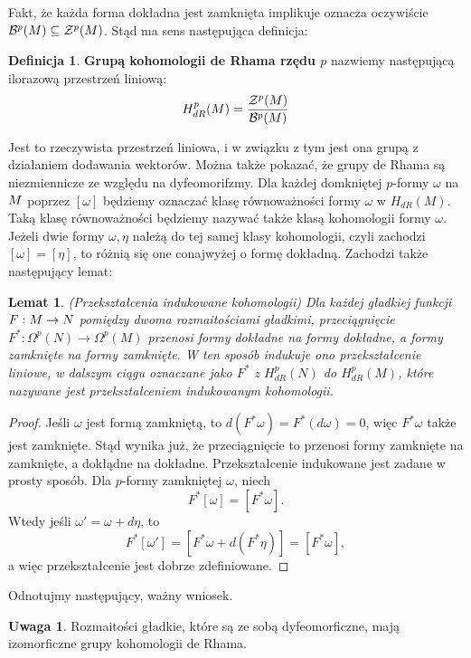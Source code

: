 \documentclass[licencjacka]{pracamgr}
\theoremstyle{definition}
\newtheorem{definition}{Definicja}[section]
\theoremstyle{definition}
\newtheorem{remark}{Uwaga}[section]
\theoremstyle{plain}
\newtheorem{lemma}{Lemat}[section]
\theoremstyle{plain}
\def\M{\ensuremath M}
\begin{document}
Fakt, że każda forma dokładna jest zamknięta implikuje oznacza oczywiście
$ \mathcal{B}^p ( \M) \subseteq \mathcal{Z}^p ( \M) $.
Stąd ma sens następująca definicja:

\begin{definition}
  \textbf{Grupą kohomologii de Rhama rzędu $p$} nazwiemy następującą
  ilorazową przestrzeń liniową:
  \[
  H^{p}_{dR} ( \M ) = \frac {\mathcal{Z}^p ( \M )} {\mathcal{B}^p ( \M )}
  \]
\end{definition}
Jest to rzeczywista przestrzeń liniowa, i w związku z tym jest ona
grupą z działaniem dodawania wektorów. Można także pokazać, że grupy de Rhama są
niezmiennicze ze względu na dyfeomorifzmy. Dla każdej domkniętej $p$-formy
$\omega$ na $\M$ poprzez $[\omega]$ będziemy oznaczać klasę równoważności
formy $\omega$ w $H_{dR} (M)$. Taką klasę równoważności będziemy nazywać także klasą
kohomologii formy $\omega$. Jeżeli dwie formy $\omega, \eta$ należą do tej samej klasy
kohomologii, czyli zachodzi $[\omega] = [\eta]$, to różnią się one conajwyżej o formę
dokładną. Zachodzi także następujący lemat:

\begin{lemma}(Przekształcenia indukowane kohomologii)
  Dla każdej gładkiej funkcji $F: \M \rightarrow N$ pomiędzy
  dwoma rozmaitościami gładkimi, przeciągnięcie 
  $F^\ast: \Omega^p(N) \rightarrow \Omega^p (M)$ przenosi formy dokładne
  na formy dokładne, a formy zamknięte na formy zamknięte. W ten sposób indukuje
  ono przekształcenie liniowe, w dalszym ciągu oznaczane jako $F^\ast$ z
  $H^p_{dR} (N)$ do $H^p_{dR} (M)$, które nazywane jest przekształceniem indukowanym
  kohomologii. \\
\end{lemma}
\begin{proof}
  Jeśli $\omega$ jest formą zamkniętą, to $d(F^\ast \omega) = F^\ast(d \omega) = 0$,
  więc $F^\ast \omega$ także jest zamknięte. Stąd wynika już, że przeciągnięcie
  to przenosi formy zamknięte na zamknięte, a dokłądne na dokładne. Przekształcenie
  indukowane jest zadane w prosty sposób. Dla $p$-formy zamkniętej $\omega$, niech
  \[
  F^\ast[\omega] = [F^\ast\omega].
  \]
  Wtedy jeśli $\omega' = \omega + d \eta$, to 
  \[
  F^\ast[\omega'] = [F^\ast\omega + d(F^\ast\eta)] = [F^\ast\omega],
  \]
  a więc przekształcenie jest dobrze zdefiniowane.
\end{proof} 
Odnotujmy następujący, ważny wniosek.

\begin{remark}
  Rozmaitości gładkie, które są ze sobą dyfeomorficzne, mają izomorficzne grupy
  kohomologii de Rhama. \\
\end{remark}
\end{document}
